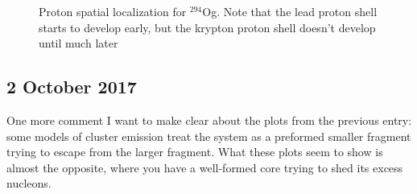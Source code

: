 \documentclass[]{report}
\begin{document}
\begin{figure}[h!]
%
  \begin{center}
    \label{fig:294Og-140024p-locali}
    \label{fig:294Og-200044p-locali}
    \label{fig:294Og-264060p-locali}  \end{center}
  \caption{Proton spatial localization for $^{294}$Og. Note that the lead proton shell starts to develop early, but the krypton proton shell doesn't develop until much later}
\end{figure}

\subsection*{2 October 2017}
One more comment I want to make clear about the plots from the previous entry: some models of cluster emission treat the system as a preformed smaller fragment trying to escape from the larger fragment. What these plots seem to show is almost the opposite, where you have a well-formed core trying to shed its excess nucleons.
\end{document}
